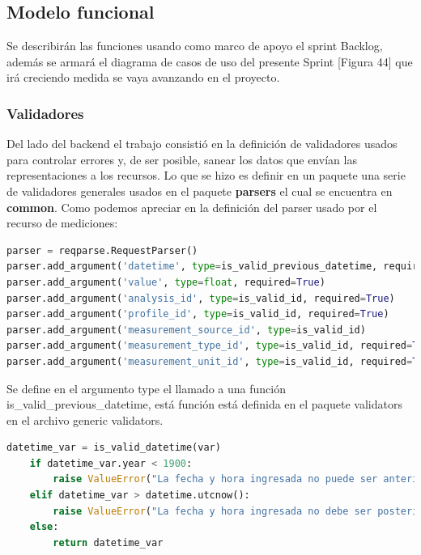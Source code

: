 \subsection{Modelo funcional} 
Se describirán las funciones usando como marco de apoyo el sprint Backlog,
además se armará el diagrama de casos de uso del presente Sprint [Figura 44] que
irá creciendo medida se vaya avanzando en el proyecto.

\subsubsection{Validadores}
Del lado del backend el trabajo consistió en la definición de validadores usados para controlar errores y, de ser posible, sanear los datos que envían las representaciones a los recursos. Lo que se hizo es definir en un paquete una serie de validadores generales usados en el paquete \textbf{parsers} el cual se encuentra en \textbf{common}. Como podemos apreciar en la definición del parser usado por el recurso de mediciones:

\begin{lstlisting}[language=Python]
parser = reqparse.RequestParser()
parser.add_argument('datetime', type=is_valid_previous_datetime, required=True)
parser.add_argument('value', type=float, required=True)
parser.add_argument('analysis_id', type=is_valid_id, required=True)
parser.add_argument('profile_id', type=is_valid_id, required=True)
parser.add_argument('measurement_source_id', type=is_valid_id)
parser.add_argument('measurement_type_id', type=is_valid_id, required=True)
parser.add_argument('measurement_unit_id', type=is_valid_id, required=True)
\end{lstlisting}

Se define en el argumento type el llamado a una función is\_valid\_previous\_datetime, está función está definida en el paquete validators en el archivo generic validators.

\begin{lstlisting}[language=Python]
    datetime_var = is_valid_datetime(var)
    if datetime_var.year < 1900:
        raise ValueError("La fecha y hora ingresada no puede ser anterior al anio 1900.")
    elif datetime_var > datetime.utcnow():
        raise ValueError("La fecha y hora ingresada no debe ser posterior a la fecha y hora actual.")
    else:
        return datetime_var
\end{lstlisting}

